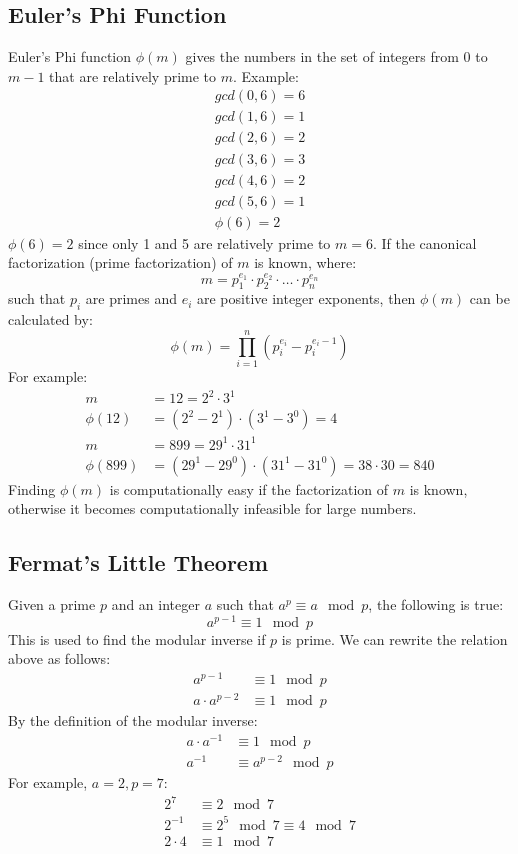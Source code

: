 \documentclass{math}
\begin{document}
\subsection*{Euler's Phi Function}
Euler's Phi function \( \phi(m) \) gives the numbers in the set of integers from
0 to \( m-1 \) that are relatively prime to \( m \). Example:
\begin{align*}
  gcd(0,6) = 6 \\
  gcd(1,6) = 1 \\
  gcd(2,6) = 2 \\
  gcd(3,6) = 3 \\
  gcd(4,6) = 2 \\
  gcd(5,6) = 1 \\
  \phi(6) = 2
\end{align*}
\( \phi(6) = 2 \) since only 1 and 5 are relatively prime to \( m = 6 \). If the
canonical factorization (prime factorization) of \( m \) is known, where:
\[ m = p_1^{e_1}\cdot p_2^{e_2}\cdot\dots\cdot p_n^{e_n} \]
such that \( p_i \) are primes and \( e_i \) are positive integer exponents,
then \( \phi(m) \) can be calculated by:
\[ \phi(m) = \prod_{i=1}^{n}(p_i^{e_i}-p_i^{e_i-1}) \]
For example:
\begin{align*}
  m &= 12 = 2^2\cdot3^1 \\
  \phi(12) &= (2^2-2^1)\cdot(3^1-3^0) = 4 \\
  m &= 899 = 29^1\cdot31^1 \\
  \phi(899) &= (29^1-29^0)\cdot(31^1-31^0) = 38\cdot30 = 840
\end{align*}
Finding \( \phi(m) \) is computationally easy if the factorization of \( m \) is
known, otherwise it becomes computationally infeasible for large numbers.

\subsection*{Fermat's Little Theorem}
Given a prime \( p \) and an integer \( a \) such that \( a^p \equiv a\mod p \),
the following is true:
\[ a^{p-1} \equiv 1\mod p \]
This is used to find the modular inverse if \( p \) is prime. We can rewrite
the relation above as follows:
\begin{align*}
  a^{p-1} &\equiv 1\mod p \\
  a\cdot a^{p-2} &\equiv 1\mod p
\end{align*}
By the definition of the modular inverse:
\begin{align*}
  a\cdot a^{-1} &\equiv 1\mod p \\
  a^{-1} &\equiv a^{p-2}\mod p
\end{align*}
For example, \( a = 2, p = 7 \):
\begin{align*}
  2^7 &\equiv 2\mod7 \\
  2^{-1} &\equiv 2^5\mod7 \equiv 4\mod7 \\
  2\cdot4 &\equiv 1\mod 7
\end{align*}
\end{document}
